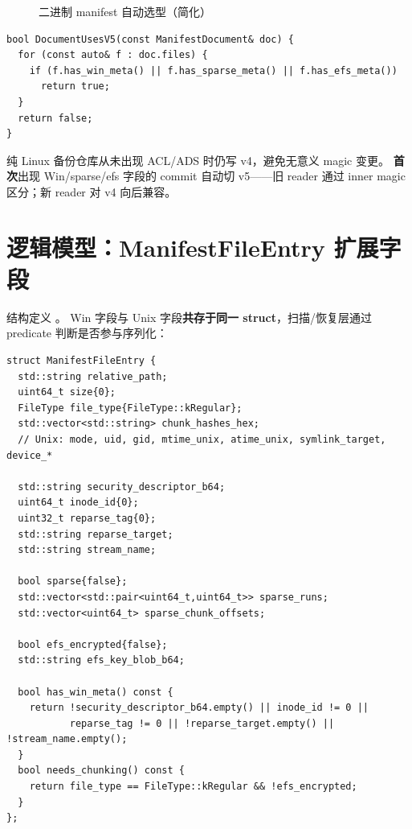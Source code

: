 \begin{figure}[htbp]
\centering
{}
\caption{二进制 manifest 自动选型（简化）}
\end{figure}

\begin{lstlisting}[caption={DocumentUsesV5 触发条件 (manifest.cc)}]
bool DocumentUsesV5(const ManifestDocument& doc) {
  for (const auto& f : doc.files) {
    if (f.has_win_meta() || f.has_sparse_meta() || f.has_efs_meta())
      return true;
  }
  return false;
}
\end{lstlisting}

\begin{designbox}
纯 Linux 备份仓库从未出现 ACL/ADS 时仍写 v4，避免无意义 magic 变更。
\textbf{首次}出现 Win/sparse/efs 字段的 commit 自动切 v5——旧 reader 通过 inner magic 区分；新 reader 对 v4 向后兼容。
\end{designbox}

\section{逻辑模型：ManifestFileEntry 扩展字段}

结构定义 。
Win 字段与 Unix 字段\textbf{共存于同一 struct}，扫描/恢复层通过 predicate 判断是否参与序列化：

\begin{lstlisting}[caption={ManifestFileEntry Windows 扩展字段}]
struct ManifestFileEntry {
  std::string relative_path;
  uint64_t size{0};
  FileType file_type{FileType::kRegular};
  std::vector<std::string> chunk_hashes_hex;
  // Unix: mode, uid, gid, mtime_unix, atime_unix, symlink_target, device_*

  std::string security_descriptor_b64;
  uint64_t inode_id{0};
  uint32_t reparse_tag{0};
  std::string reparse_target;
  std::string stream_name;

  bool sparse{false};
  std::vector<std::pair<uint64_t,uint64_t>> sparse_runs;
  std::vector<uint64_t> sparse_chunk_offsets;

  bool efs_encrypted{false};
  std::string efs_key_blob_b64;

  bool has_win_meta() const {
    return !security_descriptor_b64.empty() || inode_id != 0 ||
           reparse_tag != 0 || !reparse_target.empty() || !stream_name.empty();
  }
  bool needs_chunking() const {
    return file_type == FileType::kRegular && !efs_encrypted;
  }
};
\end{lstlisting}

